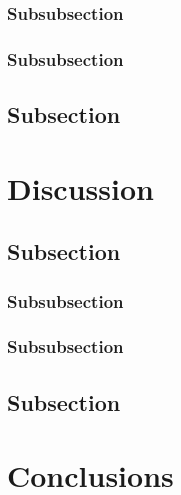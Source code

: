 \documentclass[fleqn,10pt,lineno]{wlpeerj}
\begin{document}
	\lipsum[11] %
	
	\subsubsection*{Subsubsection}
	
	\lipsum[12] %
	
	\subsubsection*{Subsubsection}
	
	\lipsum[14] %
	
	\subsection*{Subsection}
	
	\lipsum[15-20] %
	
	
	\section*{Discussion}
	
	\lipsum[10] %
	
	\subsection*{Subsection}
	
	\lipsum[11] %
	
	\subsubsection*{Subsubsection}
	
	\lipsum[12] %
	
	\subsubsection*{Subsubsection}
	
	\lipsum[14] %
	
	\subsection*{Subsection}
	
	\lipsum[15-20] %
	
	
	\section*{Conclusions}
	
\end{document}
